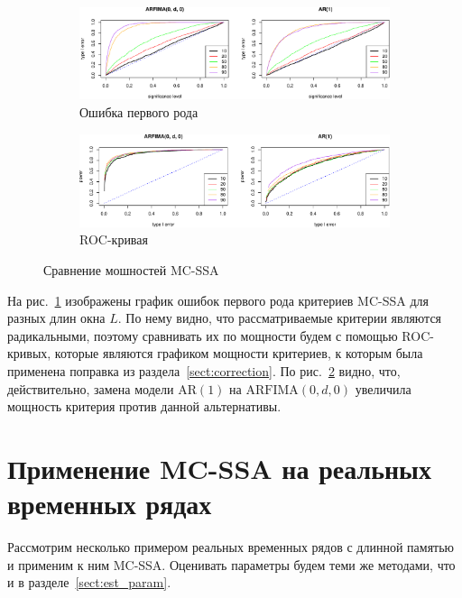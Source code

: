 \documentclass[specialist,
substylefile = spbu_report.rtx,
subf,href,colorlinks=true, 12pt]{disser}
\theoremstyle{definition}
\begin{document}
\begin{figure}[h!]
	\begin{subfigure}{\textwidth}
		\includegraphics[width=\textwidth]{img/alphaI_comp.pdf}
		\caption{Ошибка первого рода}
		\label{fig:ar1_vs_fi_alphaI}
	\end{subfigure}
	\begin{subfigure}{\textwidth}
		\includegraphics[width=\textwidth]{img/roc_comp.pdf}
		\caption{ROC-кривая}
		\label{fig:ar1_vs_fi_roc}
	\end{subfigure}
	\caption{Сравнение мошностей MC-SSA}
	\label{fig:ar1_vs_fi}
\end{figure}
На рис.~\ref{fig:ar1_vs_fi_alphaI} изображены график ошибок первого рода критериев MC-SSA для разных длин окна $L$. По нему видно, что рассматриваемые критерии являются радикальными, поэтому сравнивать их по мощности будем с помощью ROC-кривых, которые являются графиком мощности критериев, к которым была применена поправка из раздела~\ref{sect:correction}. По рис.~\ref{fig:ar1_vs_fi_roc} видно, что, действительно, замена модели $\mathrm{AR}(1)$ на $\mathrm{ARFIMA}(0, d, 0)$ увеличила мощность критерия против данной альтернативы.


\section{Применение MC-SSA на реальных временных рядах}
Рассмотрим несколько примером реальных временных рядов с длинной памятью и применим к ним MC-SSA. Оценивать параметры будем теми же методами, что и в разделе~\ref{sect:est_param}.
\end{document}

